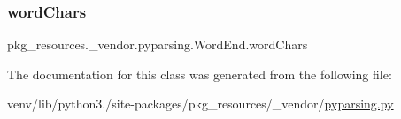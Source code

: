 \mbox{\label{classpkg__resources_1_1__vendor_1_1pyparsing_1_1WordEnd_aae7adb6c9f28333a4a02177c02982f0b}} 
\subsubsection{\texorpdfstring{word\+Chars}{wordChars}}
{\footnotesize\ttfamily pkg\+\_\+resources.\+\_\+vendor.\+pyparsing.\+Word\+End.\+word\+Chars}



The documentation for this class was generated from the following file\+:\begin{DoxyCompactItemize}
\item 
venv/lib/python3./site-\/packages/pkg\+\_\+resources/\+\_\+vendor/\hyperlink{pkg__resources_2__vendor_2pyparsing_8py}{pyparsing.\+py}\end{DoxyCompactItemize}
